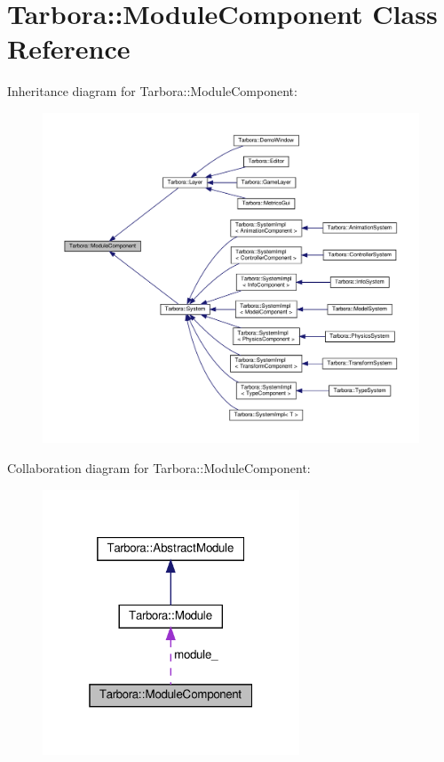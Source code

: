 \hypertarget{classTarbora_1_1ModuleComponent}{}\section{Tarbora\+:\+:Module\+Component Class Reference}
\label{classTarbora_1_1ModuleComponent}


Inheritance diagram for Tarbora\+:\+:Module\+Component\+:
\nopagebreak
\begin{figure}[H]
\begin{center}
\leavevmode
\includegraphics[width=350pt]{classTarbora_1_1ModuleComponent__inherit__graph}
\end{center}
\end{figure}


Collaboration diagram for Tarbora\+:\+:Module\+Component\+:
\nopagebreak
\begin{figure}[H]
\begin{center}
\leavevmode
\includegraphics[width=217pt]{classTarbora_1_1ModuleComponent__coll__graph}
\end{center}
\end{figure}
